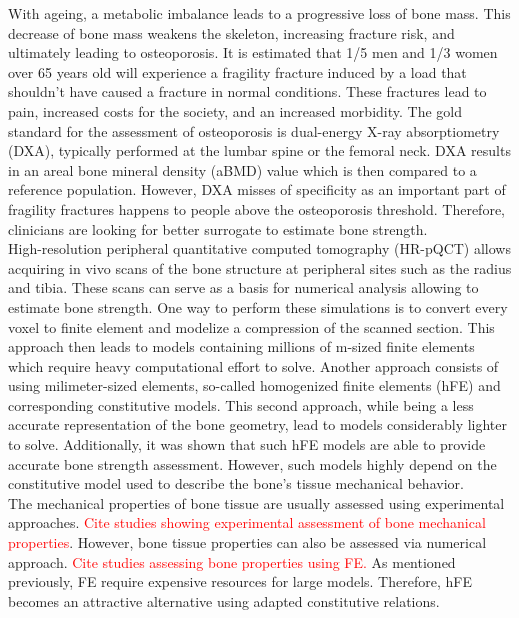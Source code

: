 \documentclass[a4paper,fleqn]{DC_ArtStyle}
\begin{document}
	With ageing, a metabolic imbalance leads to a progressive loss of bone mass.
	This decrease of bone mass weakens the skeleton, increasing fracture risk, and ultimately leading to osteoporosis.
	It is estimated that 1/5 men and 1/3 women over 65 years old will experience a fragility fracture induced by a load that shouldn't have caused a fracture in normal conditions.
	These fractures lead to pain, increased costs for the society, and an increased morbidity.
	The gold standard for the assessment of osteoporosis is dual-energy X-ray absorptiometry (DXA), typically performed at the lumbar spine or the femoral neck.
	DXA results in an areal bone mineral density (aBMD) value which is then compared to a reference population.
	However, DXA misses of specificity as an important part of fragility fractures happens to people above the osteoporosis threshold.
	Therefore, clinicians are looking for better surrogate to estimate bone strength.\\

	High-resolution peripheral quantitative computed tomography (HR-pQCT) allows acquiring in vivo scans of the bone structure at peripheral sites such as the radius and tibia.
	These scans can serve as a basis for numerical analysis allowing to estimate bone strength.
	One way to perform these simulations is to convert every voxel to finite element and modelize a compression of the scanned section.
	This approach then leads to models containing millions of \textmu m-sized finite elements which require heavy computational effort to solve.
	Another approach consists of using milimeter-sized elements, so-called homogenized finite elements (hFE) and corresponding constitutive models.
	This second approach, while being a less accurate representation of the bone geometry, lead to models considerably lighter to solve.
	Additionally, it was shown that such hFE models are able to provide accurate bone strength assessment.
	However, such models highly depend on the constitutive model used to describe the bone's tissue mechanical behavior.\\

	The mechanical properties of bone tissue are usually assessed using experimental approaches.
	\textcolor{red}{Cite studies showing experimental assessment of bone mechanical properties}.
	However, bone tissue properties can also be assessed via numerical approach.
	\textcolor{red}{Cite studies assessing bone properties using \textmu FE.}
	As mentioned previously, \textmu FE require expensive resources for large models.
	Therefore, hFE becomes an attractive alternative using adapted constitutive relations.
	
\end{document}
